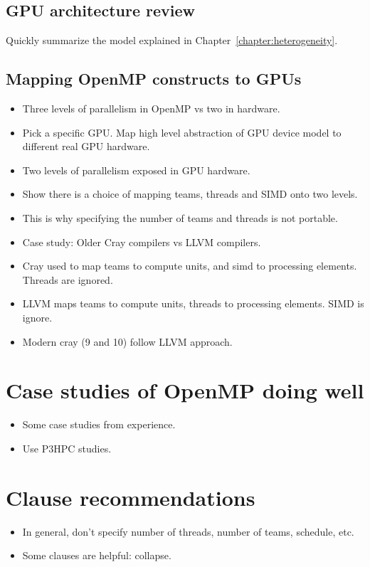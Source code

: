 \subsection{GPU architecture review}
Quickly summarize the model explained in Chapter~\ref{chapter:heterogeneity}.

\subsection{Mapping OpenMP constructs to GPUs}
\label{ssec:gpu_specific_mapping}
\begin{itemize}
  \item Three levels of parallelism in OpenMP vs two in hardware.
  \item Pick a specific GPU. Map high level abstraction of GPU device model to different real GPU hardware.
  \item Two levels of parallelism exposed in GPU hardware.
  \item Show there is a choice of mapping teams, threads and SIMD onto two levels.
  \item This is why specifying the number of teams and threads is not portable.
  \item Case study: Older Cray compilers vs LLVM compilers.
  \item Cray used to map teams to compute units, and simd to processing elements. Threads are ignored.
  \item LLVM maps teams to compute units, threads to processing elements. SIMD is ignore.
  \item Modern cray (9 and 10) follow LLVM approach.
\end{itemize}

\section{Case studies of OpenMP doing well}
\begin{itemize}
  \item Some case studies from experience.
  \item Use P3HPC studies.
\end{itemize}

\section{Clause recommendations}
\begin{itemize}
  \item In general, don't specify number of threads, number of teams, schedule, etc.
  \item Some clauses are helpful: collapse.
\end{itemize}

